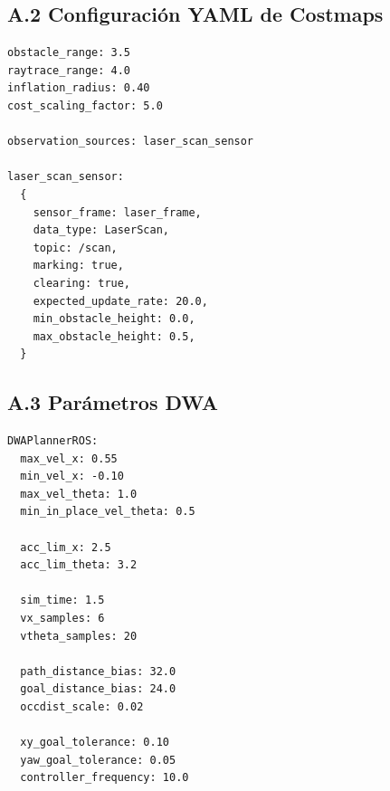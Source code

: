 \documentclass[12pt,letterpaper]{article}
\begin{document}
\subsection*{A.2 Configuración YAML de Costmaps}

\begin{lstlisting}[caption={Parámetros comunes de costmap (\texttt{costmap\_common\_params.yaml}).}, style=yamlstyle]
obstacle_range: 3.5
raytrace_range: 4.0
inflation_radius: 0.40
cost_scaling_factor: 5.0

observation_sources: laser_scan_sensor

laser_scan_sensor:
  {
    sensor_frame: laser_frame,
    data_type: LaserScan,
    topic: /scan,
    marking: true,
    clearing: true,
    expected_update_rate: 20.0,
    min_obstacle_height: 0.0,
    max_obstacle_height: 0.5,
  }
\end{lstlisting}

\subsection*{A.3 Parámetros DWA}

\begin{lstlisting}[caption={Planificador local DWA (\texttt{dwa\_local\_planner\_params.yaml}).}, style=yamlstyle]
DWAPlannerROS:
  max_vel_x: 0.55
  min_vel_x: -0.10
  max_vel_theta: 1.0
  min_in_place_vel_theta: 0.5

  acc_lim_x: 2.5
  acc_lim_theta: 3.2

  sim_time: 1.5
  vx_samples: 6
  vtheta_samples: 20

  path_distance_bias: 32.0
  goal_distance_bias: 24.0
  occdist_scale: 0.02

  xy_goal_tolerance: 0.10
  yaw_goal_tolerance: 0.05
  controller_frequency: 10.0
\end{lstlisting}
\end{document}
